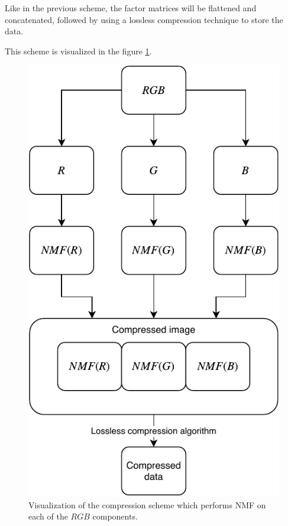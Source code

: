 \documentclass[thesis=M,english]{FITthesis}[2012/10/20]
\begin{document}
Like in the previous scheme, the factor matrices will be flattened and concatenated,
followed by using a lossless compression technique to store the data.

This scheme is visualized in the figure \ref{fig:nmf-rgbseparate-scheme}.

\begin{figure}[h]
  \centering
  \includegraphics{drawio/comprseparatergb}
  \caption[Visualization of the separate RGB compression scheme]{Visualization of the compression scheme which performs NMF on each of the
  $RGB$ components.}
  \label{fig:nmf-rgbseparate-scheme}
\end{figure}
\end{document}
